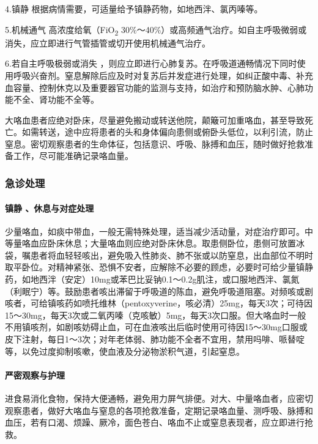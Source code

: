 4.镇静 根据病情需要，可适量给予镇静药物，如地西泮、氯丙嗪等。

5.机械通气 高浓度给氧（FiO\textsubscript{2}
30\%～40\%）或高频通气治疗。如自主呼吸微弱或消失，应立即进行气管插管或切开使用机械通气治疗。

6.若自主呼吸极弱或消失
，则应立即进行心肺复苏。在呼吸道通畅情况下同时使用呼吸兴奋剂。窒息解除后应及时对复苏后并发症进行处理，如纠正酸中毒、补充血容量、控制休克以及重要器官功能的监测与支持，如治疗和预防脑水肿、心肺功能不全、肾功能不全等。

大咯血患者应绝对卧床，尽量避免搬动或转送他院，颠簸可加重咯血，甚至导致死亡。如需转送，途中应将患者的头和身体偏向患侧或俯卧头低位，以利引流，防止窒息。密切观察患者的生命体征，包括意识、呼吸、脉搏和血压，随时做好抢救准备工作，尽可能准确记录咯血量。

\subsubsection{急诊处理}

\paragraph{镇静 、休息与对症处理}

少量咯血，如痰中带血，一般无需特殊处理，适当减少活动量，对症治疗即可。中等量咯血应卧床休息；大量咯血则应绝对卧床休息。取患侧卧位，患侧可放置冰袋，嘱患者将血轻轻咳出，避免吸入性肺炎、肺不张或以防窒息，出血部位不明时取平卧位。对精神紧张、恐惧不安者，应解除不必要的顾虑，必要时可给少量镇静药，如地西泮（安定）10mg或苯巴比妥钠0.1～0.2g肌注，或口服地西泮、氯氮{}
（利眠宁）等。鼓励患者咳出滞留于呼吸道的陈血，避免呼吸道阻塞。对频咳或剧咳者，可给镇咳药如喷托维林（pentoxyverine，咳必清）25mg，每天3次；可待因15～30mg，每天3次或二氧丙嗪（克咳敏）5mg，每天3次口服。但大咯血时一般不用镇咳剂，如剧咳妨碍止血，可在血液咳出后临时使用可待因15～30mg口服或皮下注射，每日1～3次；对年老体弱、肺功能不全者不宜用，禁用吗啡、哌替啶等，以免过度抑制咳嗽，使血液及分泌物淤积气道，引起窒息。

\paragraph{严密观察与护理}

进食易消化食物，保持大便通畅，避免用力屏气排便。对大、中量咯血者，应密切观察患者，做好大咯血与窒息的各项抢救准备，定期记录咯血量、测呼吸、脉搏和血压，若有口渴、烦躁、厥冷，面色苍白、咯血不止或窒息表现者，应立即进行抢救。

